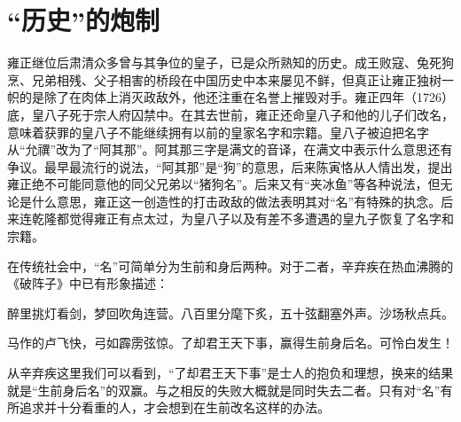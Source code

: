 \chapter{“历史”的炮制}

雍正继位后肃清众多曾与其争位的皇子，已是众所熟知的历史。成王败寇、兔死狗烹、兄弟相残、父子相害的桥段在中国历史中本来屡见不鲜，但真正让雍正独树一帜的是除了在肉体上消灭政敌外，他还注重在名誉上摧毁对手。雍正四年（1726）底，皇八子死于宗人府囚禁中。在其去世前，雍正还命皇八子和他的儿子们改名，意味着获罪的皇八子不能继续拥有以前的皇家名字和宗籍。皇八子被迫把名字从“允禩”改为了“阿其那”。阿其那三字是满文的音译，在满文中表示什么意思还有争议。最早最流行的说法，“阿其那”是“狗”的意思，后来陈寅恪从人情出发，提出雍正绝不可能同意他的同父兄弟以“猪狗名”。后来又有“夹冰鱼”等各种说法，但无论是什么意思，雍正这一创造性的打击政敌的做法表明其对“名”有特殊的执念。后来连乾隆都觉得雍正有点太过，为皇八子以及有差不多遭遇的皇九子恢复了名字和宗籍。



在传统社会中，“名”可简单分为生前和身后两种。对于二者，辛弃疾在热血沸腾的《破阵子》中已有形象描述：



\begin{bookquote}醉里挑灯看剑，梦回吹角连营。八百里分麾下炙，五十弦翻塞外声。沙场秋点兵。\end{bookquote}


\begin{bookquote}马作的卢飞快，弓如霹雳弦惊。了却君王天下事，赢得生前身后名。可怜白发生！\end{bookquote}


从辛弃疾这里我们可以看到，“了却君王天下事”是士人的抱负和理想，换来的结果就是“生前身后名”的双赢。与之相反的失败大概就是同时失去二者。只有对“名”有所追求并十分看重的人，才会想到在生前改名这样的办法。


\begin{sectionnotes}




\end{sectionnotes}
